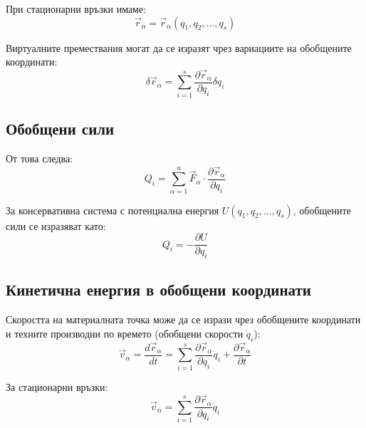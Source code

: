 \documentclass{report}
\begin{document}
При стационарни връзки имаме:
\begin{equation}
\vec{r}_\alpha = \vec{r}_\alpha(q_1, q_2, ..., q_s)
\end{equation}

Виртуалните премествания могат да се изразят чрез вариациите на обобщените координати:
\begin{equation}
\delta \vec{r}_\alpha = \sum_{i=1}^{s} \frac{\partial \vec{r}_\alpha}{\partial q_i} \delta q_i
\end{equation}

\subsection{Обобщени сили}


От това следва:
\begin{equation}
Q_i = \sum_{\alpha=1}^{n} \vec{F}_\alpha \cdot \frac{\partial \vec{r}_\alpha}{\partial q_i}
\end{equation}

За консервативна система с потенциална енергия $U(q_1, q_2, ..., q_s)$, обобщените сили се изразяват като:
\begin{equation}
Q_i = -\frac{\partial U}{\partial q_i}
\end{equation}

\subsection{Кинетична енергия в обобщени координати}

Скоростта на материалната точка може да се изрази чрез обобщените координати и техните производни по времето (обобщени скорости $\dot{q}_i$):
\begin{equation}
\vec{v}_\alpha = \frac{d\vec{r}_\alpha}{dt} = \sum_{i=1}^{s} \frac{\partial \vec{r}_\alpha}{\partial q_i} \dot{q}_i + \frac{\partial \vec{r}_\alpha}{\partial t}
\end{equation}

За стационарни връзки:
\begin{equation}
\vec{v}_\alpha = \sum_{i=1}^{s} \frac{\partial \vec{r}_\alpha}{\partial q_i} \dot{q}_i
\end{equation}
\end{document}
